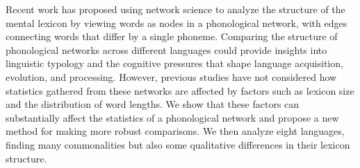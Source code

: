 Recent work has proposed using network science to analyze the structure of the mental lexicon by viewing words as nodes in a phonological network, with edges connecting words that differ by a single phoneme. Comparing the structure of phonological networks across different languages could provide insights into linguistic typology and the cognitive pressures that shape language acquisition, evolution, and processing. However, previous studies have not considered how statistics gathered from these networks are affected by factors such as lexicon size and the distribution of word lengths. We show that these factors can substantially affect the statistics of a phonological network and propose a new method for making more robust comparisons. We then analyze eight languages, finding many commonalities but also some qualitative differences in their lexicon structure.
